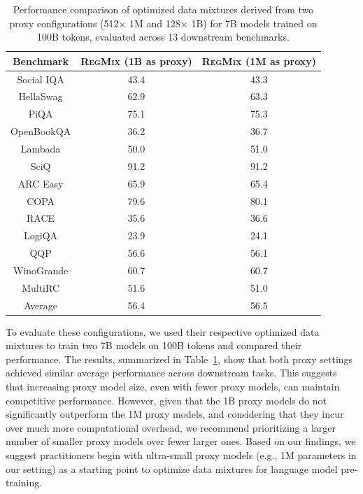 \documentclass{article}
\theoremstyle{definition}
\theoremstyle{remark}
\newcommand{\ourmethod}{\textsc{RegMix}\xspace}
\begin{document}
\begin{table}[htbp]
    \centering
    \label{tab:regmix_1m_1b}
    \caption{Performance comparison of optimized data mixtures derived from two proxy configurations (512$\times$ 1M and 128$\times$ 1B) for 7B models trained on 100B tokens, evaluated across 13 downstream benchmarks.}
    \begin{tabular}{ccc}
    \toprule
    \textbf{Benchmark} & \textbf{\ourmethod} (1B as proxy) & \textbf{\ourmethod} (1M as proxy) \\
    \midrule
         Social IQA & 43.4 & 43.3 \\
         HellaSwag & 62.9 & 63.3 \\
         PiQA & 75.1 & 75.3 \\
         OpenBookQA & 36.2 & 36.7 \\
         Lambada & 50.0 & 51.0 \\
         SciQ & 91.2 & 91.2 \\
         ARC Easy & 65.9 & 65.4\\
         COPA & 79.6 & 80.1\\
         RACE & 35.6 & 36.6 \\
         LogiQA & 23.9 & 24.1 \\
         QQP & 56.6 & 56.1 \\
         WinoGrande & 60.7 & 60.7 \\
         MultiRC & 51.6 & 51.0 \\
         \midrule
         Average & 56.4 & 56.5 \\
        \bottomrule
    \end{tabular}
\end{table}

To evaluate these configurations, we used their respective optimized data mixtures to train two 7B models on 100B tokens and compared their performance. The results, summarized in Table~\ref{tab:regmix_1m_1b}, show that both proxy settings achieved similar average performance across downstream tasks. This suggests that increasing proxy model size, even with fewer proxy models, can maintain competitive performance. However, given that the 1B proxy models do not significantly outperform the 1M proxy models, and considering that they incur over much more computational overhead, we recommend prioritizing a larger number of smaller proxy models over fewer larger ones. Based on our findings, we suggest practitioners begin with ultra-small proxy models (e.g., 1M parameters in our setting) as a starting point to optimize data mixtures for language model pre-training.
\end{document}
